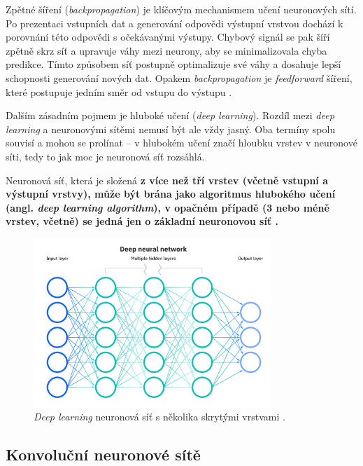 Zpětné šíření (\textit{backpropagation}) je klíčovým mechanismem učení neuronových sítí. Po prezentaci vstupních dat a generování odpovědi výstupní vrstvou dochází k porovnání této odpovědi s očekávanými výstupy. Chybový signál se pak šíří zpětně skrz síť a upravuje váhy mezi neurony, aby se minimalizovala chyba predikce. Tímto způsobem síť postupně optimalizuje své váhy a dosahuje lepší schopnosti generování nových dat. Opakem \textit{backpropagation} je \textit{feedforward} šíření, které postupuje jedním směr od vstupu do výstupu \cite{IBMANN}.

\bigskip

\noindent Dalším zásadním pojmem je hluboké učení (\textit{deep learning}). Rozdíl mezi \textit{deep learning} a neuronovými sítěmi nemusí být ale vždy jasný. Oba termíny spolu souvisí a mohou se prolínat --  v hlubokém učení značí hloubku vrstev v neuronové síti, tedy to jak moc je neuronová síť rozsáhlá. 

Neuronová síť, která je složená \bf z více než tří vrstev \rm (včetně vstupní a výstupní vrstvy), \bf může být brána jako algoritmus hlubokého učení \rm (angl. \textit{deep learning algorithm}), v opačném případě (3 nebo méně vrstev, včetně) se jedná jen o základní neuronovou síť \cite{IBMANN}.

\begin{figure}[H]
	\centering
	\includegraphics[width=0.8\textwidth]{obrazky-figures/DNN.jpeg}
	\caption{\textit{Deep learning} neuronová síť s několika skrytými vrstvami \cite{MediumDNN}.}
        \label{fig:DNN}
\end{figure}

\subsection*{Konvoluční neuronové sítě}

